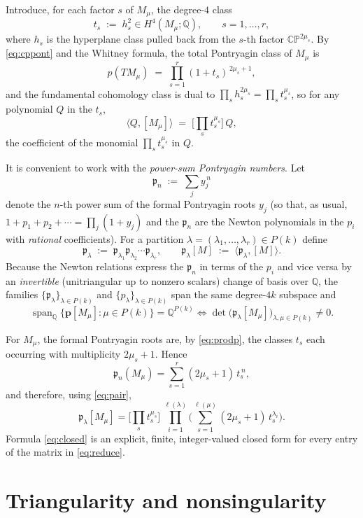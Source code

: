 \documentclass[12pt]{article}
\theoremstyle{definition}
\begin{document}
Introduce, for each factor $s$ of $M_\mu$, the degree-$4$ class
\[
t_s\;:=\;h_s^2\in H^4(M_\mu;\mathbb{Q}),
\qquad s=1,\dots,r,
\]
where $h_s$ is the hyperplane class pulled back from the $s$-th factor
$\mathbb{CP}^{2\mu_s}$.  By \eqref{eq:cppont} and the Whitney formula, the total
Pontryagin class of $M_\mu$ is
\[
p(TM_\mu)\;=\;\prod_{s=1}^{r}(1+t_s)^{\,2\mu_s+1},
\tag{4}\label{eq:prodp}
\]
and the fundamental cohomology class is dual to $\prod_s h_s^{2\mu_s}=\prod_s t_s^{\mu_s}$,
so for any polynomial $Q$ in the $t_s$,
\[
\langle Q,[M_\mu]\rangle\;=\;\big[\textstyle\prod_s t_s^{\mu_s}\big]\,Q,
\tag{5}\label{eq:pair}
\]
the coefficient of the monomial $\prod_s t_s^{\mu_s}$ in $Q$.

It is convenient to work with the \emph{power-sum Pontryagin numbers}.  Let
\[
\mathfrak{p}_n\;:=\;\sum_{j} y_j^{\,n}
\]
denote the $n$-th power sum of the formal Pontryagin roots $y_j$ (so that, as usual,
$1+p_1+p_2+\cdots=\prod_j(1+y_j)$ and the $\mathfrak{p}_n$ are the Newton polynomials in
the $p_i$ with \emph{rational} coefficients).  For a partition
$\lambda=(\lambda_1,\dots,\lambda_r)\in P(k)$ define
\[
\mathfrak{p}_\lambda\;:=\;\mathfrak{p}_{\lambda_1}\mathfrak{p}_{\lambda_2}\cdots
\mathfrak{p}_{\lambda_r},
\qquad
\mathfrak{p}_\lambda[M]\;:=\;\langle\mathfrak{p}_\lambda,[M]\rangle.
\]
Because the Newton relations express the $\mathfrak{p}_n$ in terms of the $p_i$ and vice
versa by an \emph{invertible} (unitriangular up to nonzero scalars) change of basis over
$\mathbb{Q}$, the families $\{\mathfrak{p}_\lambda\}_{\lambda\in P(k)}$ and
$\{p_\lambda\}_{\lambda\in P(k)}$ span the same degree-$4k$ subspace and
\[
\operatorname{span}_\mathbb{Q}\{\mathbf{p}[M_\mu]:\mu\in P(k)\}
=\mathbb{Q}^{P(k)}
\iff
\det\big(\mathfrak{p}_\lambda[M_\mu]\big)_{\lambda,\mu\in P(k)}\neq 0.
\tag{6}\label{eq:reduce}
\]

For $M_\mu$, the formal Pontryagin roots are, by \eqref{eq:prodp}, the classes $t_s$ each
occurring with multiplicity $2\mu_s+1$.  Hence
\[
\mathfrak{p}_n(M_\mu)=\sum_{s=1}^{r}(2\mu_s+1)\,t_s^{\,n},
\]
and therefore, using \eqref{eq:pair},
\[
\mathfrak{p}_\lambda[M_\mu]
=\Big[\textstyle\prod_{s} t_s^{\mu_s}\Big]\
\prod_{i=1}^{\ell(\lambda)}\Big(\sum_{s=1}^{\ell(\mu)}(2\mu_s+1)\,t_s^{\lambda_i}\Big).
\tag{7}\label{eq:closed}
\]
Formula \eqref{eq:closed} is an explicit, finite, integer-valued closed form for every
entry of the matrix in \eqref{eq:reduce}.

\bigskip

\section{Triangularity and nonsingularity}
\end{document}
